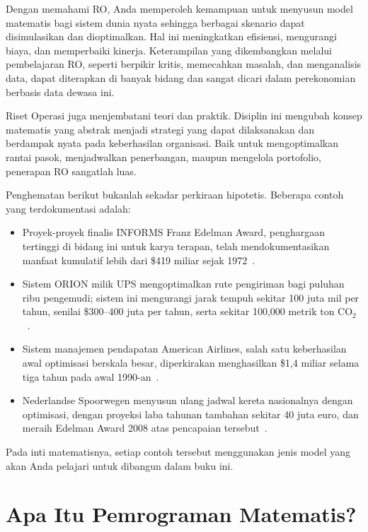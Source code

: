 Dengan memahami RO, Anda memperoleh kemampuan untuk menyusun model matematis bagi sistem dunia nyata sehingga berbagai skenario dapat disimulasikan dan dioptimalkan. Hal ini meningkatkan efisiensi, mengurangi biaya, dan memperbaiki kinerja. Keterampilan yang dikembangkan melalui pembelajaran RO, seperti berpikir kritis, memecahkan masalah, dan menganalisis data, dapat diterapkan di banyak bidang dan sangat dicari dalam perekonomian berbasis data dewasa ini.

Riset Operasi juga menjembatani teori dan praktik. Disiplin ini mengubah konsep matematis yang abstrak menjadi strategi yang dapat dilaksanakan dan berdampak nyata pada keberhasilan organisasi. Baik untuk mengoptimalkan rantai pasok, menjadwalkan penerbangan, maupun mengelola portofolio, penerapan RO sangatlah luas.

\begin{tcolorbox}[colback=green!4!white, colframe=green!45!black,
  title=\textbf{Seberapa besar nilai optimisasi?}]
Penghematan berikut bukanlah sekadar perkiraan hipotetis. Beberapa contoh yang terdokumentasi adalah:
\begin{itemize}
\item Proyek-proyek finalis INFORMS Franz Edelman Award, penghargaan tertinggi di bidang ini untuk karya terapan, telah mendokumentasikan manfaat kumulatif lebih dari \$419 miliar sejak 1972~\cite{informs2026edelman}.
\item Sistem ORION milik UPS mengoptimalkan rute pengiriman bagi puluhan ribu pengemudi; sistem ini mengurangi jarak tempuh sekitar 100 juta mil per tahun, senilai \$300--400 juta per tahun, serta sekitar 100{,}000 metrik ton CO$_2$~\cite{holland2017ups}.
\item Sistem manajemen pendapatan American Airlines, salah satu keberhasilan awal optimisasi berskala besar, diperkirakan menghasilkan \$1,4 miliar selama tiga tahun pada awal 1990-an~\cite{smith1992yield}.
\item Nederlandse Spoorwegen menyusun ulang jadwal kereta nasionalnya dengan optimisasi, dengan proyeksi laba tahunan tambahan sekitar 40 juta euro, dan meraih Edelman Award 2008 atas pencapaian tersebut~\cite{kroon2009dutch}.
\end{itemize}
Pada inti matematisnya, setiap contoh tersebut menggunakan jenis model yang akan Anda pelajari untuk dibangun dalam buku ini.
\end{tcolorbox}

\section{Apa Itu Pemrograman Matematis?}
\label{sec:what-is-MP}

